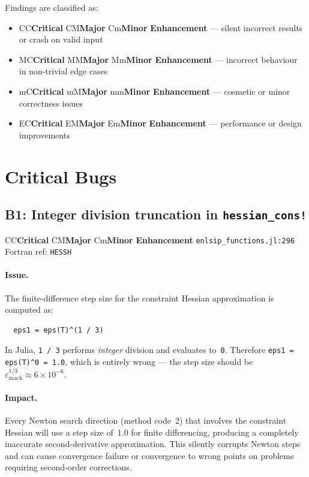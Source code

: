 \documentclass[11pt, a4paper]{article}
\newcommand{\fortranref}[1]{\texttt{#1}}
\newcommand{\juliaref}[2]{\texttt{#1:#2}}
\newcommand{\severity}[1]{%
  \ifx#1C\colorbox{red!20}{\textbf{Critical}}%
  \else\ifx#1M\colorbox{orange!20}{\textbf{Major}}%
  \else\ifx#1m\colorbox{yellow!20}{\textbf{Minor}}%
  \else\colorbox{blue!10}{\textbf{Enhancement}}%
  \fi\fi\fi%
}
\begin{document}
Findings are classified as:
\begin{itemize}[nosep]
  \item \severity{C} --- silent incorrect results or crash on valid input
  \item \severity{M} --- incorrect behaviour in non-trivial edge cases
  \item \severity{m} --- cosmetic or minor correctness issues
  \item \severity{E} --- performance or design improvements
\end{itemize}

\section{Critical Bugs}
\label{sec:critical}

\subsection{B1: Integer division truncation in \texttt{hessian\_cons!}}
\label{sec:b1}

\severity{C} \quad \juliaref{enlsip\_functions.jl}{296}
\quad Fortran ref: \fortranref{HESSH}

\paragraph{Issue.}
The finite-difference step size for the constraint Hessian approximation
is computed as:
\begin{lstlisting}
  eps1 = eps(T)^(1 / 3)
\end{lstlisting}
In Julia, \texttt{1 / 3} performs \emph{integer} division and evaluates
to~\texttt{0}.  Therefore \texttt{eps1 = eps(T)\^{}0 = 1.0}, which is
entirely wrong --- the step size should be $\varepsilon_{\mathrm{mach}}^{1/3}
\approx 6 \times 10^{-6}$.

\paragraph{Impact.}
Every Newton search direction (method code~2) that involves the
constraint Hessian will use a step size of~1.0 for finite differencing,
producing a completely inaccurate second-derivative approximation.  This
silently corrupts Newton steps and can cause convergence failure or
convergence to wrong points on problems requiring second-order
corrections.
\end{document}
